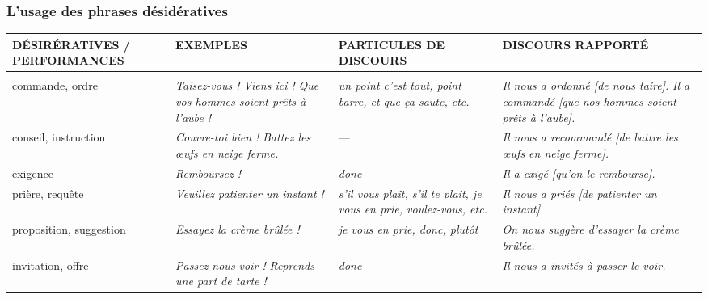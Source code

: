\documentclass[UTF8]{report}
\begin{document}
\subsubsection{L’usage des phrases désidératives}
\begin{table}[H]
\centering
\begin{adjustbox}{max width=\textwidth}
\begin{tabular}{|p{}|p{}|p{}|p{}|}
\hline
\rowcolor{cyan!20}
\textbf{DÉSIRÉRATIVES / PERFORMANCES} & \textbf{EXEMPLES} & \textbf{PARTICULES DE DISCOURS} & \textbf{DISCOURS RAPPORTÉ} \\
\hline
\rowcolor{cyan!10}
\multicolumn{4}{|l|}{\textbf{OBLIGATION}} \\
\hline
commande, ordre &
\textit{Taisez-vous !} \newline \textit{Viens ici !} \newline \textit{Que vos hommes soient prêts à l’aube !} &
\textit{un point c’est tout, point barre, et que ça saute, etc.} &
\textit{Il nous a ordonné [de nous taire].} \newline
\textit{Il a commandé [que nos hommes soient prêts à l’aube].} \\
\hline

conseil, instruction &
\textit{Couvre-toi bien !} \newline \textit{Battez les œufs en neige ferme.} &
--- &
\textit{Il nous a recommandé [de battre les œufs en neige ferme].} \\
\hline

exigence &
\textit{Remboursez !} &
\textit{donc} &
\textit{Il a exigé [qu’on le rembourse].} \\
\hline

prière, requête &
\textit{Veuillez patienter un instant !} &
\textit{s’il vous plaît, s’il te plaît, je vous en prie, voulez-vous, etc.} &
\textit{Il nous a priés [de patienter un instant].} \\
\hline

proposition, suggestion &
\textit{Essayez la crème brûlée !} &
\textit{je vous en prie, donc, plutôt} &
\textit{On nous suggère d’essayer la crème brûlée.} \\
\hline

invitation, offre &
\textit{Passez nous voir !} \newline \textit{Reprends une part de tarte !} &
\textit{donc} &
\textit{Il nous a invités à passer le voir.} \\
\hline


\end{tabular}
\end{adjustbox}
\end{table}
\end{document}
